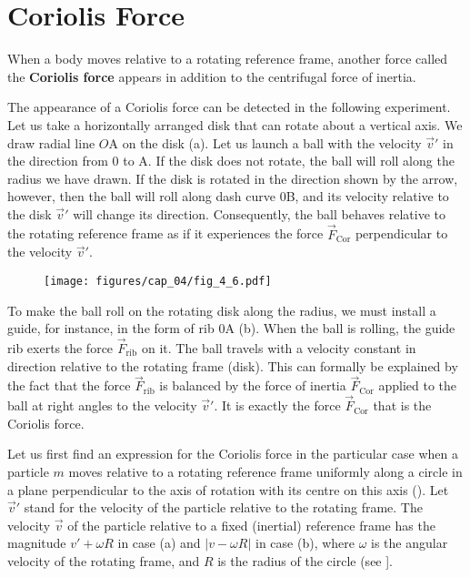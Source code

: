 \section{Coriolis Force}\label{sec:4_3}

When a body moves relative to a rotating reference frame, another force called the \textbf{Coriolis force} appears in addition to the centrifugal force of inertia.

The appearance of a Coriolis force can be detected in the following experiment. Let us take a horizontally arranged disk that can rotate about a vertical axis. We draw radial line $O$A on the disk (a). Let us launch a ball with the velocity $\vec{v}'$ in the direction from $0$ to A. If the disk does not rotate, the ball will roll along the radius we have drawn. If the disk is rotated in the direction shown by the arrow, however, then the ball will roll along dash curve $0$B, and its velocity relative to the disk $\vec{v}'$ will change its direction. Consequently, the ball behaves relative to the rotating reference frame as if it experiences the force $\vec{F}_{\text{Cor}}$ perpendicular to the velocity $\vec{v}'$.

\begin{figure}[t]
	\begin{center}
		\texttt{[image: figures/cap\_04/fig\_4\_6.pdf]}
		\caption[]{}
		\label{fig:4_6}
	\end{center}
\end{figure}

To make the ball roll on the rotating disk along the radius, we must install a guide, for instance, in the form of rib $0$A (b). When the ball is rolling, the guide rib exerts the force $\vec{F}_{\text{rib}}$ on it. The ball travels with a velocity constant in direction relative to the rotating frame (disk). This can formally be explained by the fact that the force $\vec{F}_{\text{rib}}$ is balanced by the force of inertia $\vec{F}_{\text{Cor}}$ applied to the ball at right angles to the velocity $\vec{v}'$. It is exactly the force $\vec{F}_{\text{Cor}}$ that is the Coriolis force.

Let us first find an expression for the Coriolis force in the particular case when a particle $m$ moves relative to a rotating reference frame uniformly along a circle in a plane perpendicular to the axis of rotation with its centre on this axis (). Let $\vec{v}'$ stand for the velocity of the particle relative to the rotating frame. The velocity $\vec{v}$ of the particle relative to a fixed (inertial) reference frame has the magnitude $v'+\omega R$ in case (a) and $|v-\omega R|$ in case (b), where $\omega$ is the angular velocity of the rotating frame, and $R$ is the radius of the circle (see ].


